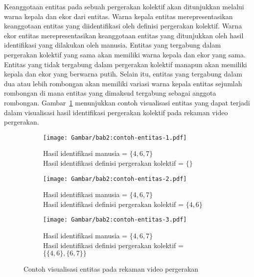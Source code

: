 Keanggotaan entitas pada sebuah pergerakan kolektif akan ditunjukkan melalui warna kepala dan ekor dari entitas. Warna kepala entitas merepresentasikan keanggotaan entitas yang diidentifikasi oleh definisi pergerakan kolektif. Warna ekor entitas merepresentasikan keanggotaan entitas yang ditunjukkan oleh hasil identifikasi yang dilakukan oleh manusia. Entitas yang tergabung dalam pergerakan kolektif yang sama akan memiliki warna kepala dan ekor yang sama. Entitas yang tidak tergabung dalam pergerakan kolektif manapun akan memiliki kepala dan ekor yang berwarna putih. Selain itu, entitas yang tergabung dalam dua atau lebih rombongan akan memiliki variasi warna kepala entitas sejumlah rombongan di mana entitas yang dimaksud tergabung sebagai anggota rombongan. Gambar~\ref{bab2:contoh-visualisasi-entitas} menunjukkan contoh visualisasi entitas yang dapat terjadi dalam visualisasi hasil identifikasi pergerakan kolektif pada rekaman video pergerakan.

\begin{figure}[b!]
    \centering
    \begin{subfigure}[htbp]{0.3\textwidth}
        \centering
        \texttt{[image: Gambar/bab2:contoh-entitas-1.pdf]}
        \caption{Hasil identifikasi manusia = $\{4, 6, 7\}$ \\ Hasil identifikasi definisi pergerakan kolektif = $\{\}$}
    \end{subfigure} \hspace{0.25cm}
    \begin{subfigure}[htbp]{0.3\textwidth}
        \centering
        \texttt{[image: Gambar/bab2:contoh-entitas-2.pdf]}
        \caption{Hasil identifikasi manusia = $\{4, 6, 7\}$ \\ Hasil identifikasi definisi pergerakan kolektif = $\{4, 6\}$}
    \end{subfigure} \hspace{0.25cm}
    \begin{subfigure}[htbp]{0.3\textwidth}
        \centering
        \texttt{[image: Gambar/bab2:contoh-entitas-3.pdf]}
        \caption{Hasil identifikasi manusia = $\{4, 6, 7\}$ \\ Hasil identifikasi definisi pergerakan kolektif = $\{\{4, 6\}, \{6, 7\}\}$}
    \end{subfigure}
    \caption{Contoh visualisasi entitas pada rekaman video pergerakan}
    \label{bab2:contoh-visualisasi-entitas}
\end{figure}

